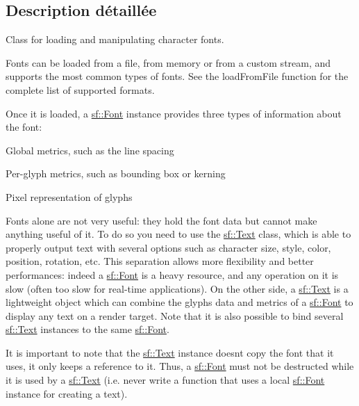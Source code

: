 \subsection{Description détaillée}
Class for loading and manipulating character fonts. 

Fonts can be loaded from a file, from memory or from a custom stream, and supports the most common types of fonts. See the load\+From\+File function for the complete list of supported formats.

Once it is loaded, a \hyperlink{classsf_1_1Font}{sf\+::\+Font} instance provides three types of information about the font\+: \begin{DoxyItemize}
\item Global metrics, such as the line spacing \item Per-\/glyph metrics, such as bounding box or kerning \item Pixel representation of glyphs\end{DoxyItemize}
Fonts alone are not very useful\+: they hold the font data but cannot make anything useful of it. To do so you need to use the \hyperlink{classsf_1_1Text}{sf\+::\+Text} class, which is able to properly output text with several options such as character size, style, color, position, rotation, etc. This separation allows more flexibility and better performances\+: indeed a \hyperlink{classsf_1_1Font}{sf\+::\+Font} is a heavy resource, and any operation on it is slow (often too slow for real-\/time applications). On the other side, a \hyperlink{classsf_1_1Text}{sf\+::\+Text} is a lightweight object which can combine the glyphs data and metrics of a \hyperlink{classsf_1_1Font}{sf\+::\+Font} to display any text on a render target. Note that it is also possible to bind several \hyperlink{classsf_1_1Text}{sf\+::\+Text} instances to the same \hyperlink{classsf_1_1Font}{sf\+::\+Font}.

It is important to note that the \hyperlink{classsf_1_1Text}{sf\+::\+Text} instance doesn\textquotesingle{}t copy the font that it uses, it only keeps a reference to it. Thus, a \hyperlink{classsf_1_1Font}{sf\+::\+Font} must not be destructed while it is used by a \hyperlink{classsf_1_1Text}{sf\+::\+Text} (i.\+e. never write a function that uses a local \hyperlink{classsf_1_1Font}{sf\+::\+Font} instance for creating a text).

